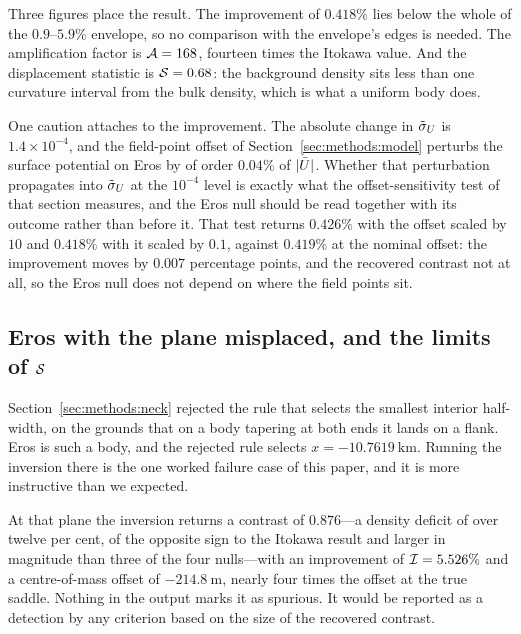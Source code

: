 Three figures place the result. The improvement of $0.418\%$ lies below
the whole of the $0.9$--$5.9\%$ envelope, so no comparison with the
envelope's edges is needed. The amplification factor is $\mathcal{A} = 168$,
fourteen times the Itokawa value. And the displacement statistic is
$\mathcal{S} = 0.68$: the background density sits less than one curvature
interval from the bulk density, which is what a uniform body does.

One caution attaches to the improvement. The absolute change in
$\tilde{\sigma}_{U}$ is $1.4\times10^{-4}$, and the field-point offset of
Section~\ref{sec:methods:model} perturbs the surface potential on Eros by
of order $0.04\%$ of $\lvert\bar{U}\rvert$. Whether that perturbation
propagates into $\tilde{\sigma}_{U}$ at the $10^{-4}$ level is exactly what the
offset-sensitivity test of that section measures, and the Eros null
should be read together with its outcome rather than before it. That
test returns $0.426\%$ with the offset scaled by $10$ and $0.418\%$ with it
scaled by $0.1$, against $0.419\%$ at the nominal offset: the improvement
moves by $0.007$ percentage points, and the recovered contrast not at all,
so the Eros null does not depend on where the field points sit.

\subsection{Eros with the plane misplaced, and the limits of \texorpdfstring{$\mathcal{S}$}{S}}
\label{sec:nulls:misplaced}

Section~\ref{sec:methods:neck} rejected the rule that selects the
smallest interior half-width, on the grounds that on a body tapering at
both ends it lands on a flank. Eros is such a body, and the rejected rule
selects $x = \SI{-10.7619}{\kilo\metre}$. Running the inversion there is
the one worked failure case of this paper, and it is more instructive
than we expected.

At that plane the inversion returns a contrast of $0.876$---a density
deficit of over twelve per cent, of the opposite sign to the Itokawa
result and larger in magnitude than three of the four nulls---with an
improvement of $\mathcal{I} = 5.526\%$ and a centre-of-mass offset of
$\SI{-214.8}{\metre}$, nearly four times the offset at the true saddle.
Nothing in the output marks it as spurious. It would be reported as a
detection by any criterion based on the size of the recovered contrast.

